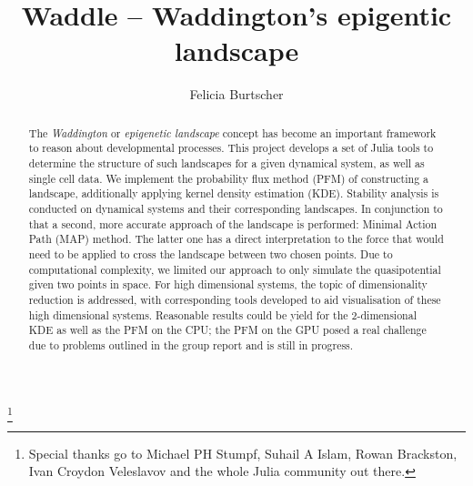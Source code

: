 \documentclass[journal, a4paper]{IEEEtran}
\begin{document}
	\title{Waddle -- Waddington's epigentic landscape}
	\author{Felicia Burtscher}
	\thanks{Special thanks go to Michael PH Stumpf, Suhail A Islam, Rowan Brackston, Ivan Croydon Veleslavov and the whole Julia community out there.}\\
	
\maketitle


\begin{abstract}
The \textit{Waddington} or \textit{epigenetic landscape} concept has become an important framework to reason about developmental processes. This project develops a set of Julia tools to determine the structure of such landscapes for a given dynamical system, as well as single cell data. We implement the probability flux method (PFM) of constructing a landscape, additionally applying kernel density estimation (KDE). Stability analysis is conducted on dynamical systems and their corresponding landscapes. In conjunction to that a second, more accurate approach %
of the landscape is performed: Minimal Action Path (MAP) method. The latter one has a direct interpretation to the force that would need to be applied to cross the landscape between two chosen points. Due to computational complexity, we limited our approach to only simulate the quasipotential given two points in space. %
For high dimensional systems, the topic of dimensionality reduction is addressed, with corresponding tools developed to aid visualisation of these high dimensional systems. 
Reasonable results could be yield for the 2-dimensional KDE as well as the PFM on the CPU; the PFM on the GPU posed a real challenge due to problems outlined in the group report and is still in progress.


\end{abstract}
\end{document}
